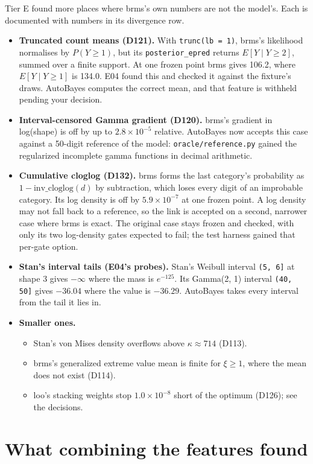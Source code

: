 \documentclass[11pt]{article}
\newcommand{\code}[1]{\texttt{#1}}
\begin{document}
Tier E found more places where brms's own numbers are not the model's. Each is documented with numbers in its divergence
row.
\begin{itemize}
\item \textbf{Truncated count means (D121).} With \code{trunc(lb = 1)}, brms's likelihood normalises by $P(Y \ge 1)$, but
  its \code{posterior\_epred} returns $E[Y \mid Y \ge 2]$, summed over a finite support. At one frozen point brms gives
  106.2, where $E[Y \mid Y \ge 1]$ is 134.0. E04 found this and checked it against the fixture's draws. AutoBayes computes
  the correct mean, and that feature is withheld pending your decision.
\item \textbf{Interval-censored Gamma gradient (D120).} brms's gradient in log(shape) is off by up to $2.8\times10^{-5}$
  relative. AutoBayes now accepts this case against a 50-digit reference of the model: \code{oracle/reference.py} gained
  the regularized incomplete gamma functions in decimal arithmetic.
\item \textbf{Cumulative cloglog (D132).} brms forms the last category's probability as $1 - \mathrm{inv\_cloglog}(d)$ by
  subtraction, which loses every digit of an improbable category. Its log density is off by $5.9\times10^{-7}$ at one
  frozen point. A log density may not fall back to a reference, so the link is accepted on a second, narrower case where
  brms is exact. The original case stays frozen and checked, with only its two log-density gates expected to fail; the
  test harness gained that per-gate option.
\item \textbf{Stan's interval tails (E04's probes).} Stan's Weibull interval \code{(5, 6]} at shape 3 gives $-\infty$
  where the mass is $e^{-125}$. Its Gamma(2, 1) interval \code{(40, 50]} gives $-36.04$ where the value is $-36.29$.
  AutoBayes takes every interval from the tail it lies in.
\item \textbf{Smaller ones.}
  \begin{itemize}
  \item Stan's von Mises density overflows above $\kappa \approx 714$ (D113).
  \item brms's generalized extreme value mean is finite for $\xi \ge 1$, where the mean does not exist (D114).
  \item loo's stacking weights stop $1.0\times10^{-8}$ short of the optimum (D126); see the decisions.
  \end{itemize}
\end{itemize}

\section{What combining the features found}
\end{document}
